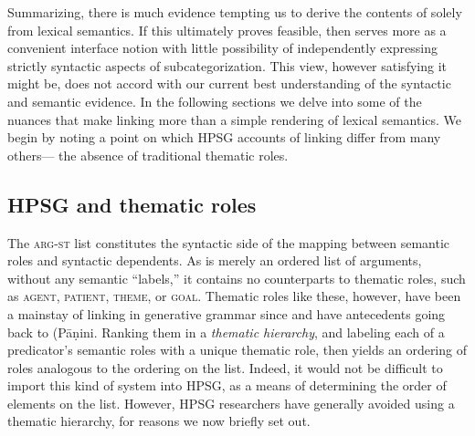 \documentclass[output=paper]{langsci/langscibook}
\begin{document}
Summarizing, there is much evidence tempting us to derive the contents of \argst solely from lexical semantics.
If this ultimately proves feasible, then \argst serves more as a convenient interface notion with little possibility of independently expressing strictly syntactic aspects of subcategorization.
This view, however satisfying it might be, does not accord with our current best understanding of the syntactic and semantic evidence.
In the following sections we delve into some of the nuances that make linking more than a simple rendering of lexical semantics.
We begin by noting a point on which HPSG accounts of linking differ from many others--- the absence of traditional thematic roles.


\subsection{HPSG and thematic roles}
\label{thetaroles}

The \textsc{arg-st} list constitutes the syntactic side of the mapping between semantic roles and syntactic dependents.  As \argst is merely an ordered list of arguments, without any semantic ``labels,'' it contains no counterparts to thematic roles, such as \textsc{agent}, \textsc{patient}, \textsc{theme}, or \textsc{goal}.  Thematic roles like these, however, have been a mainstay of linking in generative grammar since \citet{Fillmore1968} and have antecedents going back to (P\={a}\d{n}ini.
Ranking them in a \emph{thematic hierarchy}, and labeling each of a predicator's semantic roles with a unique thematic role, then yields an ordering of roles analogous to the ordering on the \argst list.  Indeed, it would not be difficult to import this kind of system into HPSG, as a means of determining the order of elements on the \argst list.  However, HPSG researchers have generally avoided using a thematic hierarchy, for reasons we now briefly set out.
\end{document}
